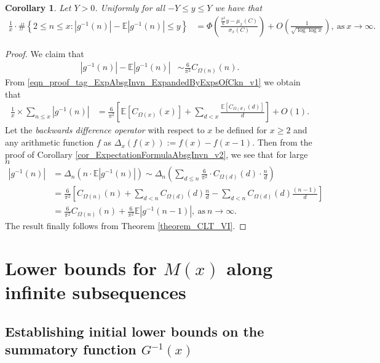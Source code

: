 \documentclass[11pt,reqno,a4letter]{article}
\numberwithin{figure}{section}
\numberwithin{table}{section}
\theoremstyle{plain}
\newtheorem{cor}[theorem]{Corollary}
\numberwithin{theorem}{section}
\theoremstyle{definition}
\begin{document}
\begin{cor} 
\label{cor_CLT_VII} 
Let $Y > 0$. 
Uniformly for all $-Y \leq y \leq Y$ 
we have that 
\begin{align*} 
\frac{1}{x} \cdot \#\left\{2 \leq n \leq x:|g^{-1}(n)| - 
     \mathbb{E}|g^{-1}(n)| \leq y\right\} & = 
     \Phi\left(\frac{\frac{\pi^2}{6} y - \mu_x(C)}{\sigma_x(C)}\right) + 
     O\left(\frac{1}{\sqrt{\log\log x}}\right), 
     \mathrm{\ as\ } x \rightarrow \infty. 
\end{align*} 
\end{cor} 
\begin{proof} 
We claim that 
\begin{align*} 
|g^{-1}(n)| - \mathbb{E}|g^{-1}(n)| & \sim \frac{6}{\pi^2} C_{\Omega(n)}(n). 
\end{align*} 
From \eqref{eqn_proof_tag_ExpAbsgInvn_ExpandedByExpsOfCkn_v1}
we obtain that 
\begin{align*} 
\frac{1}{x} \times \sum_{n \leq x} |g^{-1}(n)| & = 
     \frac{6}{\pi^2} \left[\mathbb{E}[C_{\Omega(x)}(x)] + \sum_{d<x} 
     \frac{\mathbb{E}[C_{\Omega(d)}(d)]}{d}\right] + O(1). 
\end{align*} 
Let the \emph{backwards difference operator} with respect to $x$ 
be defined for $x \geq 2$ and any arithmetic function $f$ as 
$\Delta_x(f(x)) := f(x) - f(x-1)$. Then from the proof of 
Corollary \ref{cor_ExpectationFormulaAbsgInvn_v2}, 
we see that for large $n$ 
\begin{align*} 
|g^{-1}(n)| & = \Delta_n(n \cdot \mathbb{E}|g^{-1}(n)|) 
     \sim \Delta_n\left(\sum_{d \leq n} \frac{6}{\pi^2} \cdot C_{\Omega(d)}(d) \cdot \frac{n}{d}\right) \\ 
     & = \frac{6}{\pi^2}\left[C_{\Omega(n)}(n) + \sum_{d < n} C_{\Omega(d)}(d) \frac{n}{d} - 
     \sum_{d<n} C_{\Omega(d)}(d) \frac{(n-1)}{d}\right] \\ 
     & = \frac{6}{\pi^2} C_{\Omega(n)}(n) + \frac{6}{\pi^2} \mathbb{E}|g^{-1}(n-1)|, 
     \mathrm{\ as\ } n \rightarrow \infty. 
\end{align*} 
The result finally follows from Theorem \ref{theorem_CLT_VI}. 
\end{proof} 

\newpage 
\section{Lower bounds for $M(x)$ along infinite subsequences} 
\label{Section_KeyApplications} 

\subsection{Establishing initial lower bounds on the summatory function $G^{-1}(x)$} 
\label{Section_ProofOfValidityOfAverageOrderLowerBounds} 
\end{document}
